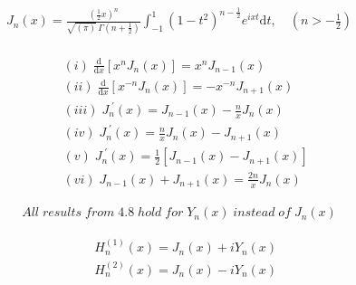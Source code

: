 \[\begin{align} \label{thrm4.7} J_n(x) = \frac{(\tfrac 12x)^n}{\sqrt{(\pi)}\, \Gamma(n+\tfrac 12)}\int_{-1}^1(1-t^2)^{n- \tfrac 12}e^{ixt}\mathrm dt,\quad (n>-\tfrac 12) \end{align}\]

\[\begin{align} \label{thrm4.8} \\\ & (i)\; \frac{\mathrm d}{\mathrm dx}\left[ x^nJ_n(x) \right] = x^nJ_{n-1}(x) \\\ & (ii)\; \frac{\mathrm d}{\mathrm dx}\left[ x^{-n}J_n(x) \right] = -x^{-n}J_{n+1}(x) \\\ & (iii)\; J_n^{\; '}(x) = J_{n-1}(x) - \frac nxJ_n(x) \\\ & (iv)\; J_n^{\; '}(x) =\frac nxJ_n(x) - J_{n+1}(x) \\\ & (v)\; J_n^{\; '}(x) = \tfrac 12 \left[J_{n-1}(x) - J_{n+1}(x) \right] \\\ & (vi)\; J_{n-1}(x) + J_{n+1}(x) = \frac {2n}xJ_n(x) \end{align}\]

\[\begin{align} \label{thrm4.9} All \; results \; from \; 4.8 \; hold \; for \; Y_n(x) \; instead \; of \; J_n(x) \end{align}\]

\[\begin{align} \label{hankdef} & H_n^{(1)}(x) = J_n(x) + iY_n(x)\\\ & H_n^{(2)}(x) = J_n(x) - iY_n(x) \end{align}\]

